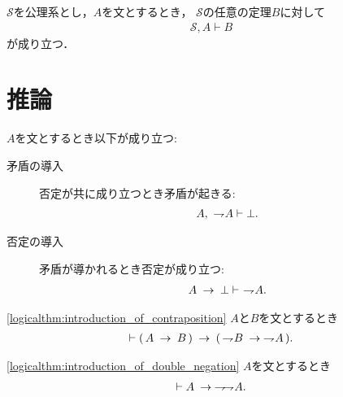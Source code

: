 	\begin{screen}
		\begin{metathm}[公理が増えても証明可能]
			$\mathscr{S}$を公理系とし，$A$を文とするとき，
			$\mathscr{S}$の任意の定理$B$に対して
			\begin{align}
				\mathscr{S}, A \vdash B
			\end{align}
			が成り立つ．
		\end{metathm}
	\end{screen}
	
\section{推論}
	\begin{screen}
		\begin{logicalaxm}[否定と矛盾に関する規則]
		\label{logicalaxm:rules_of_negation_and_contradiction}
			$A$を文とするとき以下が成り立つ:
			\begin{description}
				\item[矛盾の導入] 否定が共に成り立つとき矛盾が起きる:
					\begin{align}
						A,\ \rightharpoondown\hspace{-0.25em} A \vdash \bot.
					\end{align}
				\item[否定の導入] 矛盾が導かれるとき否定が成り立つ:
					\begin{align}
						A \hspace{0.25em}\rightarrow\hspace{0.25em} \bot \vdash\ \rightharpoondown\hspace{-0.25em} A.
					\end{align}
			\end{description}
		\end{logicalaxm}
	\end{screen}
	
	\begin{screen}
		\begin{logicalthm}[対偶命題が導かれる]
		\ref{logicalthm:introduction_of_contraposition}
			$A$と$B$を文とするとき
			\begin{align}
				\vdash (\, A \hspace{0.25em}\rightarrow\hspace{0.25em} B\, ) 
				\hspace{0.25em}\rightarrow\hspace{0.25em} (\, \rightharpoondown\hspace{-0.25em} B \hspace{0.25em}\rightarrow\hspace{0.25em} \rightharpoondown\hspace{-0.25em} A\, ).
			\end{align}
		\end{logicalthm}
	\end{screen}
	
	\begin{screen}
		\begin{logicalthm}[二重否定の導入]
		\ref{logicalthm:introduction_of_double_negation}
			$A$を文とするとき
			\begin{align}
				\vdash A \hspace{0.25em}\rightarrow\hspace{0.25em} \rightharpoondown\hspace{-0.25em} \rightharpoondown\hspace{-0.25em} A.
			\end{align}
		\end{logicalthm}
	\end{screen}
	
